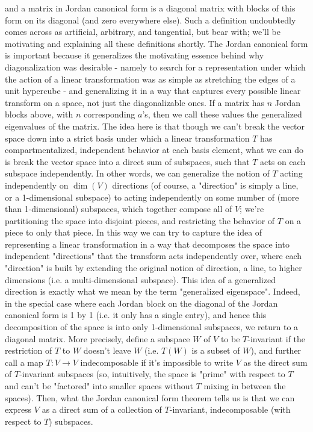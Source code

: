 \documentclass{article}
\newcommand{\nn}{\leavevmode \newline \newline}
\begin{document}
and a matrix in Jordan canonical form is a diagonal matrix with blocks of this form on its diagonal (and zero everywhere else). Such a definition undoubtedly comes across as artificial, arbitrary, and tangential, but bear with; we'll be motivating and explaining all these definitions shortly. The Jordan canonical form is important because it generalizes the motivating essence behind why diagonalization was desirable - namely to search for a representation under which the action of a linear transformation was as simple as stretching the edges of a unit hypercube - and generalizing it in a way that captures every possible linear transform on a space, not just the diagonalizable ones. If a matrix has $ n $ Jordan blocks above, with $ n $ corresponding $ a $'s, then we call these values the generalized eigenvalues of the matrix. The idea here is that though we can't break the vector space down into a strict basis under which a linear transformation $ T $ has compartmentalized, independent behavior at each basis element, what we can do is break the vector space into a direct sum of subspaces, such that $ T $ acts on each subspace independently. In other words, we can generalize the notion of $ T $ acting independently on $ \dim(V) $ directions (of course, a "direction" is simply a line, or a 1-dimensional subspace) to acting independently on some number of (more than 1-dimensional) subspaces, which together compose all of $ V $; we're partitioning the space into disjoint pieces, and restricting the behavior of $ T $ on a piece to only that piece. In this way we can try to capture the idea of representing a linear transformation in a way that decomposes the space into independent "directions" that the transform acts independently over, where each "direction" is built by extending the original notion of direction, a line, to higher dimensions (i.e. a multi-dimensional subspace). This idea of a generalized direction is exactly what we mean by the term "generalized eigenspace". Indeed, in the special case where each Jordan block on the diagonal of the Jordan canonical form is 1 by 1 (i.e. it only has a single entry), and hence this decomposition of the space is into only 1-dimensional subspaces, we return to a diagonal matrix.
\nn
More precisely, define a subspace $ W $ of $ V $ to be $ T $-invariant if the restriction of $ T $ to $ W $ doesn't leave $ W $ (i.e. $ T(W) $ is a subset of $ W $), and further call a map $ T: V \rightarrow V $ indecomposable if it's impossible to write $ V $ as the direct sum of $ T $-invariant subspaces (so, intuitively, the space is "prime" with respect to $ T $ and can't be "factored" into smaller spaces without $ T $ mixing in between the spaces). Then, what the Jordan canonical form theorem tells us is that we can express $ V $ as a direct sum of a collection of $ T $-invariant, indecomposable (with respect to $ T $) subspaces.
\end{document}
